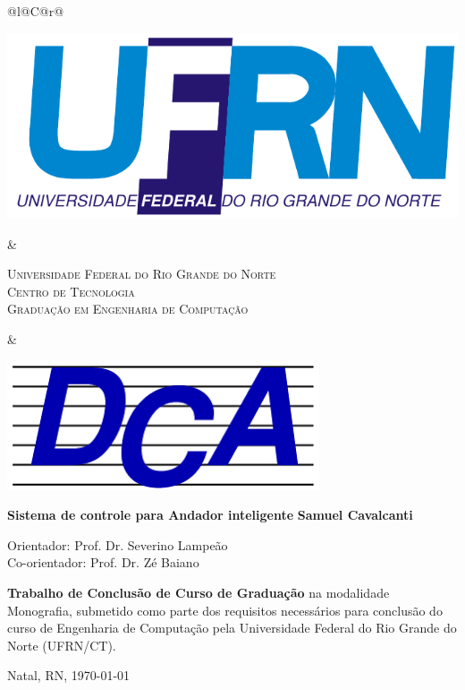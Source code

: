 %
%

\begin{titlepage}

\begin{center}

\small

\begin{tabularx}{\linewidth}{@{}l@{}C@{}r@{}}
\parbox[c]{3cm}{\includegraphics[width=\linewidth]{./figuras/UFRN}} &
\begin{center}
\textsf{\textsc{Universidade Federal do Rio Grande do Norte\\
Centro de Tecnologia\\
Graduação em Engenharia de Computação}}
\end{center} &
\parbox[c]{3cm}{\includegraphics[width=\linewidth]{./figuras/dca_logo.png}}
\end{tabularx}

\vfill
\LARGE
\textbf{Sistema de controle para Andador inteligente}
\vfill
\Large
\textbf{Samuel Cavalcanti}
\vfill

\normalsize

Orientador: Prof. Dr. Severino Lampeão
\\[2ex] Co-orientador: Prof. Dr. Zé Baiano %

\vfill

\hfill
\parbox{0.5\linewidth}{\textbf{%
Trabalho de Conclusão de Curso de Graduação} na modalidade Monografia, 
submetido como parte dos requisitos necessários para 
conclusão do curso de Engenharia de Computação pela 
Universidade Federal do Rio Grande do Norte (UFRN/CT).
}

\vfill

\large

Natal, RN, \today

\end{center}

\end{titlepage}
